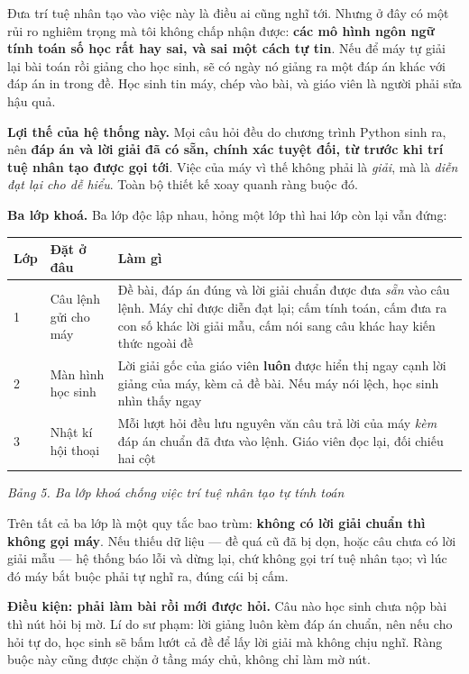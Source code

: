 Đưa trí tuệ nhân tạo vào việc này là điều ai cũng nghĩ tới. Nhưng ở đây có một
rủi ro nghiêm trọng mà tôi không chấp nhận được: \textbf{các mô hình ngôn ngữ
tính toán số học rất hay sai, và sai một cách tự tin}. Nếu để máy tự giải lại
bài toán rồi giảng cho học sinh, sẽ có ngày nó giảng ra một đáp án khác với đáp
án in trong đề. Học sinh tin máy, chép vào bài, và giáo viên là người phải sửa
hậu quả.

\textbf{Lợi thế của hệ thống này.} Mọi câu hỏi đều do chương trình Python sinh
ra, nên \textbf{đáp án và lời giải đã có sẵn, chính xác tuyệt đối, từ trước khi
trí tuệ nhân tạo được gọi tới}. Việc của máy vì thế không phải là \textit{giải},
mà là \textit{diễn đạt lại cho dễ hiểu}. Toàn bộ thiết kế xoay quanh ràng buộc
đó.

\textbf{Ba lớp khoá.} Ba lớp độc lập nhau, hỏng một lớp thì hai lớp còn lại vẫn
đứng:

\begin{center}
\begin{tabular}{|p{1.1cm}|p{4.2cm}|p{8.1cm}|}
\hline
\textbf{Lớp} & \textbf{Đặt ở đâu} & \textbf{Làm gì} \\ \hline
1 & Câu lệnh gửi cho máy &
Đề bài, đáp án đúng và lời giải chuẩn được đưa \textit{sẵn} vào câu lệnh. Máy
chỉ được diễn đạt lại; cấm tính toán, cấm đưa ra con số khác lời giải mẫu, cấm
nói sang câu khác hay kiến thức ngoài đề \\ \hline
2 & Màn hình học sinh &
Lời giải gốc của giáo viên \textbf{luôn} được hiển thị ngay cạnh lời giảng của
máy, kèm cả đề bài. Nếu máy nói lệch, học sinh nhìn thấy ngay \\ \hline
3 & Nhật kí hội thoại &
Mỗi lượt hỏi đều lưu nguyên văn câu trả lời của máy \textit{kèm} đáp án chuẩn
đã đưa vào lệnh. Giáo viên đọc lại, đối chiếu hai cột \\ \hline
\end{tabular}
\end{center}
\textit{Bảng 5. Ba lớp khoá chống việc trí tuệ nhân tạo tự tính toán}

Trên tất cả ba lớp là một quy tắc bao trùm: \textbf{không có lời giải chuẩn thì
không gọi máy}. Nếu thiếu dữ liệu --- đề quá cũ đã bị dọn, hoặc câu chưa có lời
giải mẫu --- hệ thống báo lỗi và dừng lại, chứ không gọi trí tuệ nhân tạo; vì
lúc đó máy bắt buộc phải tự nghĩ ra, đúng cái bị cấm.

\textbf{Điều kiện: phải làm bài rồi mới được hỏi.} Câu nào học sinh chưa nộp
bài thì nút hỏi bị mờ. Lí do sư phạm: lời giảng luôn kèm đáp án chuẩn, nên nếu
cho hỏi tự do, học sinh sẽ bấm lướt cả đề để lấy lời giải mà không chịu nghĩ.
Ràng buộc này cũng được chặn ở tầng máy chủ, không chỉ làm mờ nút.

